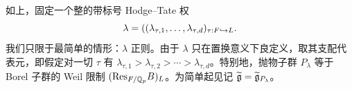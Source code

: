 如上，固定一个整的带标号 Hodge–Tate 权
\[
\lambda=((\lambda_{\tau,1},\dots,\lambda_{\tau,d})_{\tau:F\hookrightarrow L}.
\]
我们只限于最简单的情形：$\lambda$ 正则。由于 $\lambda$ 只在置换意义下良定义，取其支配代表元，即假定对一切 $\tau$ 有 $\lambda_{\tau,1}>\lambda_{\tau,2}>\cdots>\lambda_{\tau,d}$。特别地，抛物子群 $P_\lambda$ 等于 Borel 子群的 Weil 限制 $(\mathrm{Res}_{F/\mathbb{Q}_p}B)_L$。为简单起见记 $\widetilde{\mathfrak{g}}=\widetilde{\mathfrak{g}}_{P_\lambda}$。

